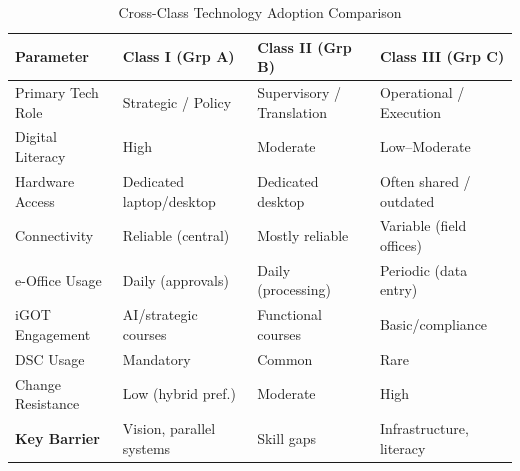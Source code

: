 \documentclass[12pt,a4paper]{article}
\begin{document}
\begin{table}[H]
\centering
\caption{Cross-Class Technology Adoption Comparison}
\label{tab:comparison}
\begin{tabularx}{\textwidth}{@{}Xlll@{}}
\toprule
\textbf{Parameter} & \textbf{Class I (Grp A)} & \textbf{Class II (Grp B)} & \textbf{Class III (Grp C)} \\
\midrule
Primary Tech Role & Strategic / Policy & Supervisory / Translation & Operational / Execution \\
Digital Literacy & High & Moderate & Low--Moderate \\
Hardware Access & Dedicated laptop/desktop & Dedicated desktop & Often shared / outdated \\
Connectivity & Reliable (central) & Mostly reliable & Variable (field offices) \\
e-Office Usage & Daily (approvals) & Daily (processing) & Periodic (data entry) \\
iGOT Engagement & AI/strategic courses & Functional courses & Basic/compliance \\
DSC Usage & Mandatory & Common & Rare \\
Change Resistance & Low (hybrid pref.) & Moderate & High \\
\textbf{Key Barrier} & Vision, parallel systems & Skill gaps & Infrastructure, literacy \\
\bottomrule
\end{tabularx}
\end{table}
\end{document}
